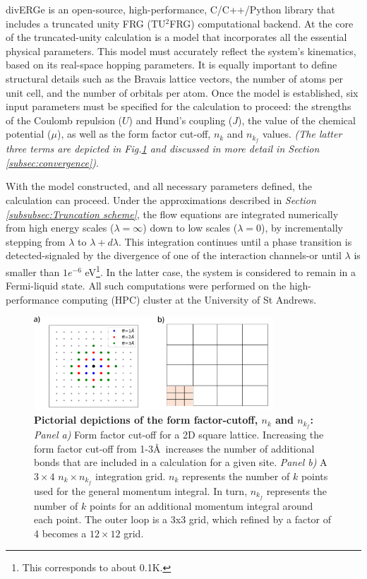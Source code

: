 \documentclass[11pt]{article}
\begin{document}
\noindent divERGe is an open-source, high-performance, C/C++/Python library that includes a truncated unity FRG (TU$^2$FRG) computational backend\cite{profe2024diverge}. 
At the core of the truncated-unity calculation is a model that incorporates all the essential physical parameters. This model must accurately reflect the system's kinematics, based on its real-space hopping parameters.
It is equally important to define structural details such as the Bravais lattice vectors, the number of atoms per unit cell, 
and the number of orbitals per atom. Once the model is established, six input parameters must be specified for the calculation to proceed: 
the strengths of the Coulomb repulsion ($U$) and Hund’s coupling ($J$), the value of the chemical potential ($\mu$), as well as the form factor cut-off, $n_k$ and $n_{k_f}$
values. \textit{(The latter three terms are depicted in Fig.\ref{fig:nknkf} and discussed in more detail in Section \ref{subsec:convergence})}.\par
\medskip
\noindent With the model constructed, and all necessary parameters defined, 
the calculation can proceed. Under the approximations described in \textit{Section \ref{subsubsec:Truncation scheme}},
the flow equations are integrated numerically from high energy scales ($\lambda = \infty$) down to low scales ($\lambda = 0$), 
by incrementally stepping from $\lambda$ to $\lambda + d\lambda$. This integration continues until a phase transition is detected-signaled 
by the divergence of one of the interaction channels-or until $\lambda$ is smaller than $1e^{-6}$ eV\footnote{This corresponds to about 0.1K.}. In the latter case, the system is considered to remain 
in a Fermi-liquid state. All such computations were performed on the high-performance computing (HPC) cluster at the University of St Andrews.

\begin{figure}[htbp]  %
    \centering
    \includegraphics[width=0.8\textwidth]{nknkfff.png}  %
    \caption{\textbf{Pictorial depictions of the form factor-cutoff, $n_k$ and $n_{k_f}$:} \textit{Panel a)}
    Form factor cut-off for a 2D square lattice. 
    Increasing the form factor cut-off from 1-3\AA\  increases the number of additional bonds
    that are included in a calculation for a given site. 
    \textit{Panel b)} A $3 \times 4$ $n_k \times n_{k_f}$ integration grid. $n_k$ represents the number of $k$ points used for the general momentum integral. In turn, 
    $n_{k_f}$ represents the number of $k$ points for an additional momentum integral around each point. The outer loop is a 3x3 grid, which refined 
    by a factor of 4 becomes a $12 \times 12$ grid.}
    \label{fig:nknkf}
\end{figure}
 
\end{document}
